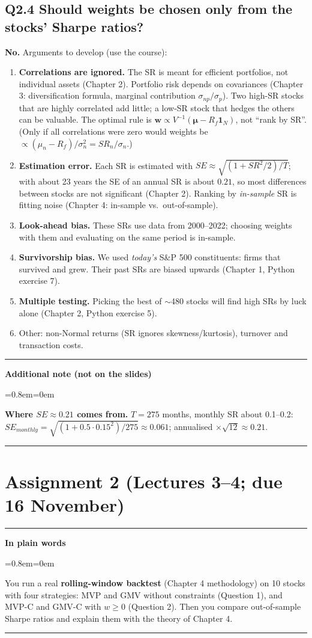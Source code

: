 \documentclass[11pt,a4paper]{report}
\newenvironment{notebox}[1]
  {\par\medskip\Needspace{6\baselineskip}\noindent\rule{\linewidth}{0.4pt}\par\nopagebreak
   \noindent\textbf{#1}\par\nopagebreak
   \begin{list}{}{\leftmargin=0.8em\rightmargin=0em\topsep=2pt}\item[]}
  {\end{list}\nopagebreak\noindent\rule{\linewidth}{0.4pt}\par\medskip}
\newenvironment{plainbox}{\begin{notebox}{In plain words}}{\end{notebox}}
\newenvironment{addnote}{\begin{notebox}{Additional note (not on the slides)}}{\end{notebox}}
\newcommand{\one}{\mathbf{1}_N}
\newcommand{\w}{\bm{w}}
\newcommand{\mub}{\bm{\mu}}
\begin{document}
\subsection*{Q2.4 Should weights be chosen only from the stocks' Sharpe ratios?}
\textbf{No.} Arguments to develop (use the course):
\begin{enumerate}
  \item \textbf{Correlations are ignored.} The SR is meant for efficient portfolios,
    not individual assets (Chapter 2). Portfolio risk depends on covariances
    (Chapter 3: diversification formula, marginal contribution
    $\sigma_{np}/\sigma_p$). Two high-SR stocks that are highly correlated add
    little; a low-SR stock that hedges the others can be valuable. The optimal
    rule is $\w\propto V^{-1}(\mub-R_f\one)$, not ``rank by SR''. (Only if all
    correlations were zero would weights be $\propto(\mu_n-R_f)/\sigma_n^2=SR_n/\sigma_n$.)
  \item \textbf{Estimation error.} Each SR is estimated with
    $SE\approx\sqrt{(1+SR^2/2)/T}$; with about 23 years the SE of an annual SR is
    about $0.21$, so most differences between stocks are not significant
    (Chapter 2). Ranking by \emph{in-sample} SR is fitting noise (Chapter 4:
    in-sample vs.\ out-of-sample).
  \item \textbf{Look-ahead bias.} These SRs use data from 2000--2022; choosing
    weights with them and evaluating on the same period is in-sample.
  \item \textbf{Survivorship bias.} We used \emph{today's} S\&P 500 constituents:
    firms that survived and grew. Their past SRs are biased upwards (Chapter 1,
    Python exercise 7).
  \item \textbf{Multiple testing.} Picking the best of $\sim$480 stocks will find
    high SRs by luck alone (Chapter 2, Python exercise 5).
  \item Other: non-Normal returns (SR ignores skewness/kurtosis), turnover and
    transaction costs.
\end{enumerate}
\begin{addnote}
\textbf{Where $SE\approx0.21$ comes from.} $T=275$ months, monthly SR about 0.1--0.2:
$SE_{monthly}=\sqrt{(1+0.5\cdot0.15^2)/275}\approx0.061$; annualised
$\times\sqrt{12}\approx0.21$.
\end{addnote}

\section{Assignment 2 (Lectures 3--4; due 16 November)}
\begin{plainbox}
You run a real \textbf{rolling-window backtest} (Chapter 4 methodology) on 10
stocks with four strategies: MVP and GMV without constraints (Question 1), and
MVP-C and GMV-C with $w\ge0$ (Question 2). Then you compare out-of-sample Sharpe
ratios and explain them with the theory of Chapter 4.
\end{plainbox}
\end{document}
